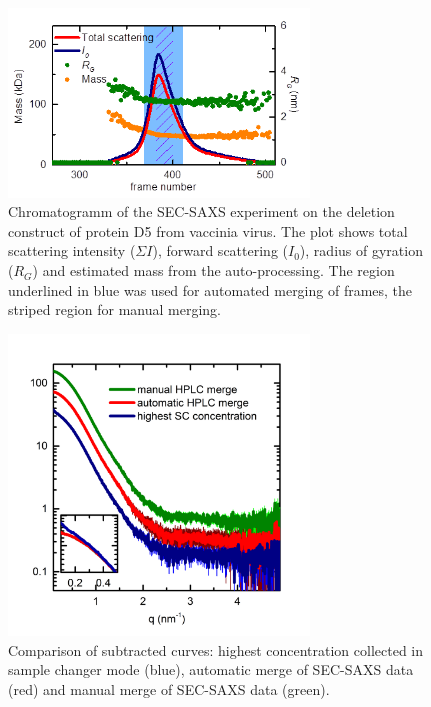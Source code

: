 \documentclass[preprint,pdf]{iucr}              %
\begin{document}
\begin{figure}
\centering
\includegraphics[width=8cm]{sec.png}
\caption{Chromatogramm of the SEC-SAXS experiment on the deletion construct of
protein D5 from vaccinia virus.
The plot shows total scattering intensity ($\Sigma I$), forward scattering
($I_0$), radius of gyration ($R_G$) and estimated mass from the
auto-processing.
The region underlined in blue was used for automated merging of frames, the
striped region for manual merging.}
\label{fgr:SEC}
\end{figure}

\begin{figure}
\centering
\includegraphics[width=8cm]{curves.png}
\caption{Comparison of subtracted curves: highest concentration collected in 
sample changer mode (blue), automatic merge of SEC-SAXS data (red) and manual
merge of SEC-SAXS data (green).}
\label{fgr:curves}
\end{figure}
\end{document}
